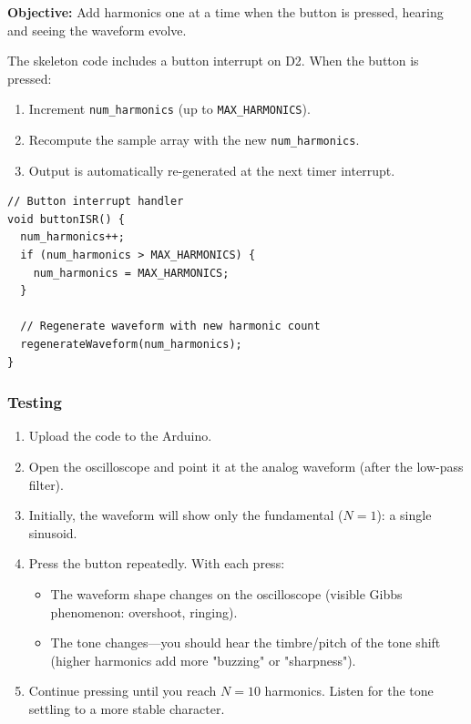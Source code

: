 \documentclass[11pt,letterpaper]{article}
\begin{document}
\textbf{Objective:} Add harmonics one at a time when the button is pressed, hearing and seeing the waveform evolve.

The skeleton code includes a button interrupt on D2. When the button is pressed:
\begin{enumerate}
    \item Increment \texttt{num\_harmonics} (up to \texttt{MAX\_HARMONICS}).
    \item Recompute the sample array with the new \texttt{num\_harmonics}.
    \item Output is automatically re-generated at the next timer interrupt.
\end{enumerate}

\begin{verbatim}
// Button interrupt handler
void buttonISR() {
  num_harmonics++;
  if (num_harmonics > MAX_HARMONICS) {
    num_harmonics = MAX_HARMONICS;
  }

  // Regenerate waveform with new harmonic count
  regenerateWaveform(num_harmonics);
}
\end{verbatim}

\subsubsection*{Testing}

\begin{enumerate}
    \item Upload the code to the Arduino.
    \item Open the oscilloscope and point it at the analog waveform (after the low-pass filter).
    \item Initially, the waveform will show only the fundamental ($N=1$): a single sinusoid.
    \item Press the button repeatedly. With each press:
    \begin{itemize}
        \item The waveform shape changes on the oscilloscope (visible Gibbs phenomenon: overshoot, ringing).
        \item The tone changes—you should hear the timbre/pitch of the tone shift (higher harmonics add more "buzzing" or "sharpness").
    \end{itemize}
    \item Continue pressing until you reach $N = 10$ harmonics. Listen for the tone settling to a more stable character.
\end{enumerate}
\end{document}
